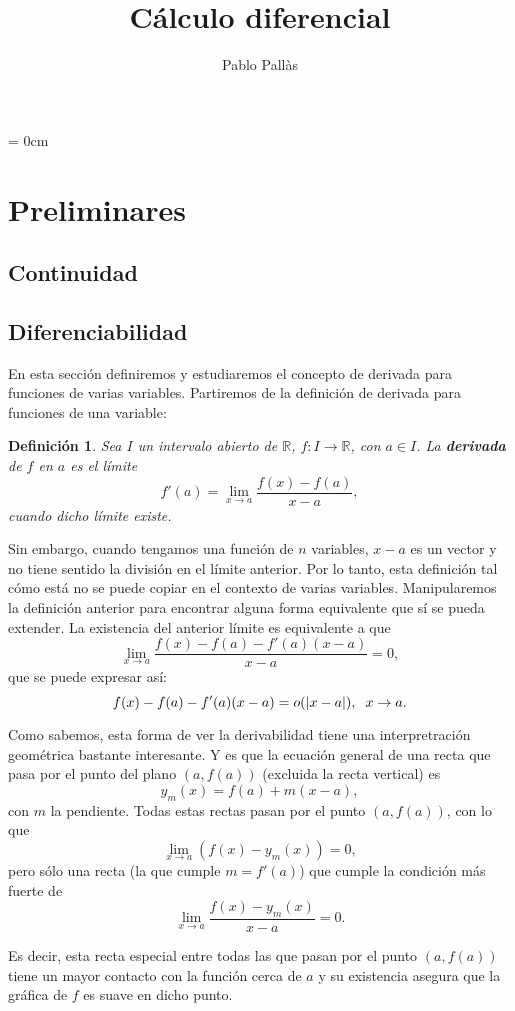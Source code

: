 \documentclass[12pt]{article}
\author{Pablo Pallàs}
\title{Cálculo diferencial}
\newtheorem{definition}[theorem]{Definición}
\providecommand{\abs}[1]{\lvert#1\rvert}
\begin{document}
\rmfamily
\maketitle
\tableofcontents
\parindent= 0cm


\section{Preliminares}
\subsection{Continuidad}
\subsection{Diferenciabilidad}
En esta sección definiremos y estudiaremos el concepto de derivada para funciones de varias variables. Partiremos de la definición de derivada para funciones de una variable:
\begin{definition} Sea $I$ un intervalo abierto de $\mathbb{R}$, $f \colon I \longrightarrow \mathbb{R}$, con $a \in I$. La \textbf{derivada} de $f$ en $a$ es el límite $$f'(a)= \lim_{x\rightarrow a}\dfrac{f(x)-f(a)}{x-a},$$ cuando dicho límite existe.
\end{definition}

Sin embargo, cuando tengamos una función de $n$ variables, $x-a$ es un vector y no tiene sentido la división en el límite anterior. Por lo tanto, esta definición tal cómo está no se puede copiar en el contexto de varias variables. Manipularemos la definición anterior para encontrar alguna forma equivalente que sí se pueda extender.
La existencia del anterior límite es equivalente a que $$\lim_{x\rightarrow a}\dfrac{f(x)-f(a)-f'(a)(x-a)}{x-a} = 0,$$ que se puede expresar así: $$f(x)-f(a)-f'(a)(x-a)=o(\abs{x-a}), \hspace{0.2cm} x\rightarrow a.$$

Como sabemos, esta forma de ver la derivabilidad tiene una interpretración geométrica bastante interesante. Y es que la ecuación general de una recta que pasa por el punto del plano $(a, f(a))$ (excluida la recta vertical) es $$y_m(x)=f(a)+m(x-a),$$ con $m$ la pendiente. Todas estas rectas pasan por el punto $(a,f(a))$, con lo que $$\lim_{x \rightarrow a}(f(x)-y_m(x))=0,$$ pero sólo una recta (la que cumple $m = f'(a)$) que cumple la condición más fuerte de $$\lim_{x\rightarrow a} \dfrac{f(x)-y_m(x)}{x-a} =0.$$

Es decir, esta recta especial entre todas las que pasan por el punto $(a,f(a))$ tiene un mayor contacto con la función cerca de $a$ y su existencia asegura que la gráfica de $f$ es suave en dicho punto.
\end{document}
